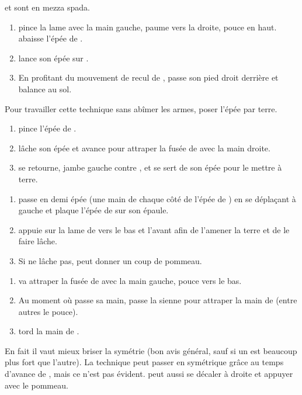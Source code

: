 \begin{technique}

\A et \D sont en mezza spada.

\begin{enumerate}
	\item \A pince la lame avec la main gauche, paume vers la droite, pouce en haut.
		\A abaisse l'épée de \D.
	\item \A lance son épée sur \D.
	\item En profitant du mouvement de recul de \D, \A passe son pied droit derrière et balance \D au sol.
\end{enumerate}

Pour travailler cette technique sans abîmer les armes, poser l'épée par terre.
\end{technique}


\begin{technique}

\begin{enumerate}
	\item \A pince l'épée de \D.
	\item \A lâche son épée et avance pour attraper la fusée de \D avec la main droite.
	\item \A se retourne, jambe gauche contre \D, et se sert de son épée pour le mettre à terre.
\end{enumerate}
\end{technique}


\begin{technique}

\begin{enumerate}
	\item \A passe en demi épée (une main de chaque côté de l'épée de \D) en se déplaçant à gauche et plaque l'épée de \D sur son épaule.
	\item \A appuie sur la lame de \D vers le bas et l'avant afin de l'amener la terre et de le faire lâche.
	\item Si \D ne lâche pas, \A peut donner un coup de pommeau.
\end{enumerate}
\end{technique}


\begin{technique}

\begin{enumerate}
	\item \A va attraper la fusée de \D avec la main gauche, pouce vers le bas.
	\item Au moment où \A passe sa main, \D passe la sienne pour attraper la main de \A (entre autres le pouce).
	\item \D tord la main de \A.
\end{enumerate}

En fait il vaut mieux briser la symétrie (bon avis général, sauf si un est beaucoup plus fort que l'autre).
La technique peut passer en symétrique grâce au temps d'avance de \D, mais ce n'est pas évident.
\D peut aussi se décaler à droite et appuyer avec le pommeau.
\end{technique}

